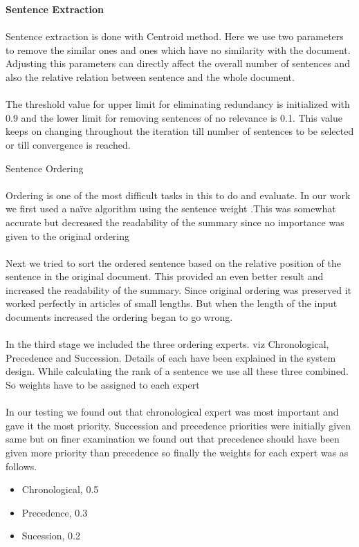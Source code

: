 \textbf{Sentence Extraction} 
\paragraph{}	Sentence extraction is done with Centroid method. Here we use two parameters to remove the similar ones and ones which have no similarity with the document. Adjusting this parameters can directly affect the overall number of sentences and also the relative relation between sentence and the whole document.
\paragraph{}	The threshold value for upper limit for eliminating redundancy is initialized with 0.9 and the lower limit for removing sentences of no relevance is 0.1. This value keeps on changing throughout the iteration till number of sentences to be selected or till convergence is reached.

	
Sentence Ordering
\paragraph{}	Ordering is one of the most difficult tasks in this to do and evaluate. In our work we first used a naïve algorithm using the sentence weight .This was somewhat accurate but decreased the readability of the summary since no importance was given to the original ordering
\paragraph{}	Next we tried to sort the ordered sentence based on the relative position of the sentence in the original document. This provided an even better result and increased the readability of the summary. Since original ordering was preserved it worked perfectly in articles of small lengths. But when the length of the input documents increased the ordering began to go wrong.
\paragraph{}	In the third stage we included the three ordering experts. viz Chronological, Precedence and Succession. Details of each have been explained in the system design. While calculating the rank of a sentence we use all these three combined. So weights have to be assigned to each expert
\paragraph{}	In our testing we found out that chronological expert was most important and gave it the most priority. Succession and precedence priorities were initially given same but on finer examination we found out that precedence should have been given more priority than precedence so finally the weights for each expert was as follows.
\begin{itemize}
\item Chronological, 0.5
\item Precedence, 0.3
\item Sucession, 0.2
\end{itemize}

